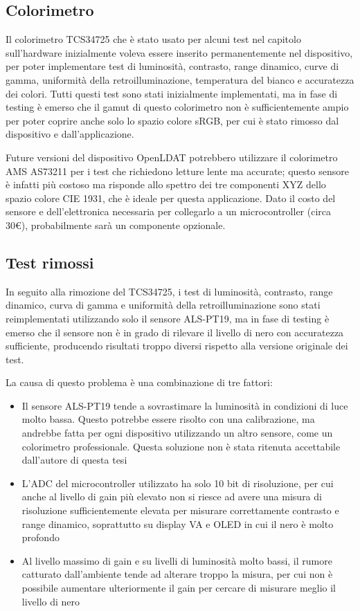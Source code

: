 \subsection{Colorimetro}
Il colorimetro TCS34725 che è stato usato per alcuni test nel capitolo sull'hardware inizialmente voleva essere inserito permanentemente nel dispositivo, per poter implementare test di luminosità, contrasto, range dinamico, curve di gamma, uniformità della retroilluminazione, temperatura del bianco e accuratezza dei colori. Tutti questi test sono stati inizialmente implementati, ma in fase di testing è emerso che il gamut di questo colorimetro non è sufficientemente ampio per poter coprire anche solo lo spazio colore sRGB, per cui è stato rimosso dal dispositivo e dall'applicazione.

Future versioni del dispositivo OpenLDAT potrebbero utilizzare il colorimetro AMS AS73211 per i test che richiedono letture lente ma accurate; questo sensore è infatti più costoso ma risponde allo spettro dei tre componenti XYZ dello spazio colore CIE 1931, che è ideale per questa applicazione. Dato il costo del sensore e dell'elettronica necessaria per collegarlo a un microcontroller (circa 30€), probabilmente sarà un componente opzionale.

\subsection{Test rimossi}
In seguito alla rimozione del TCS34725, i test di luminosità, contrasto, range dinamico, curva di gamma e uniformità della retroilluminazione sono stati reimplementati utilizzando solo il sensore ALS-PT19, ma in fase di testing è emerso che il sensore non è in grado di rilevare il livello di nero con accuratezza sufficiente, producendo risultati troppo diversi rispetto alla versione originale dei test.

La causa di questo problema è una combinazione di tre fattori:\begin{itemize}
	\item Il sensore ALS-PT19 tende a sovrastimare la luminosità in condizioni di luce molto bassa. Questo potrebbe essere risolto con una calibrazione, ma andrebbe fatta per ogni dispositivo utilizzando un altro sensore, come un colorimetro professionale. Questa soluzione non è stata ritenuta accettabile dall'autore di questa tesi
	\item L'ADC del microcontroller utilizzato ha solo 10 bit di risoluzione, per cui anche al livello di gain più elevato non si riesce ad avere una misura di risoluzione sufficientemente elevata per misurare correttamente contrasto e range dinamico, soprattutto su display VA e OLED in cui il nero è molto profondo
	\item Al livello massimo di gain e su livelli di luminosità molto bassi, il rumore catturato dall'ambiente tende ad alterare troppo la misura, per cui non è possibile aumentare ulteriormente il gain per cercare di misurare meglio il livello di nero
\end{itemize}

